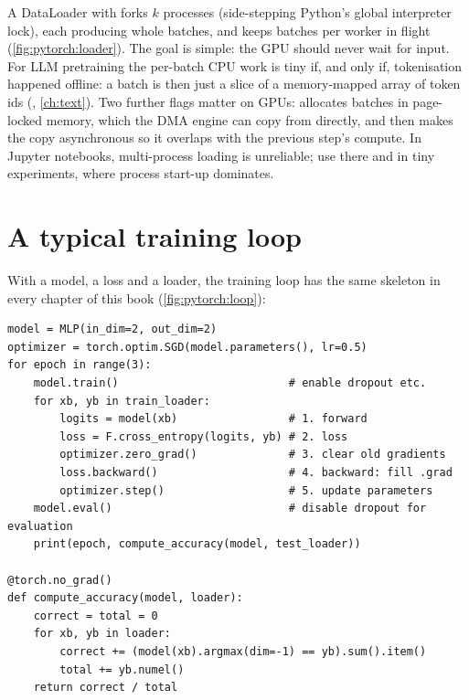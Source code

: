\begin{systemslens}
A DataLoader with  forks $k$ processes (side-stepping Python's global interpreter lock),
each producing whole batches, and keeps  batches per worker in flight
(\cref{fig:pytorch:loader}). The goal is simple: the GPU should never wait for input. For LLM pretraining the
per-batch CPU work is tiny if, and only if, tokenisation happened offline: a batch is then just a slice of a
memory-mapped array of token ids (, \cref{ch:text}). Two further flags
matter on GPUs:  allocates batches in page-locked memory, which the DMA engine can copy
from directly, and  then makes the copy asynchronous so it overlaps with
the previous step's compute. In Jupyter notebooks, multi-process loading is unreliable; use
 there and in tiny experiments, where process start-up dominates.
\end{systemslens}

\section{A typical training loop}\label{sec:pytorch:loop}

With a model, a loss and a loader, the training loop has the same skeleton in every chapter of this book
(\cref{fig:pytorch:loop}):

\begin{lstlisting}[caption={The canonical training loop.},label={lst:pytorch:loop}]
model = MLP(in_dim=2, out_dim=2)
optimizer = torch.optim.SGD(model.parameters(), lr=0.5)
for epoch in range(3):
    model.train()                          # enable dropout etc.
    for xb, yb in train_loader:
        logits = model(xb)                 # 1. forward
        loss = F.cross_entropy(logits, yb) # 2. loss
        optimizer.zero_grad()              # 3. clear old gradients
        loss.backward()                    # 4. backward: fill .grad
        optimizer.step()                   # 5. update parameters
    model.eval()                           # disable dropout for evaluation
    print(epoch, compute_accuracy(model, test_loader))

@torch.no_grad()
def compute_accuracy(model, loader):
    correct = total = 0
    for xb, yb in loader:
        correct += (model(xb).argmax(dim=-1) == yb).sum().item()
        total += yb.numel()
    return correct / total
\end{lstlisting}

